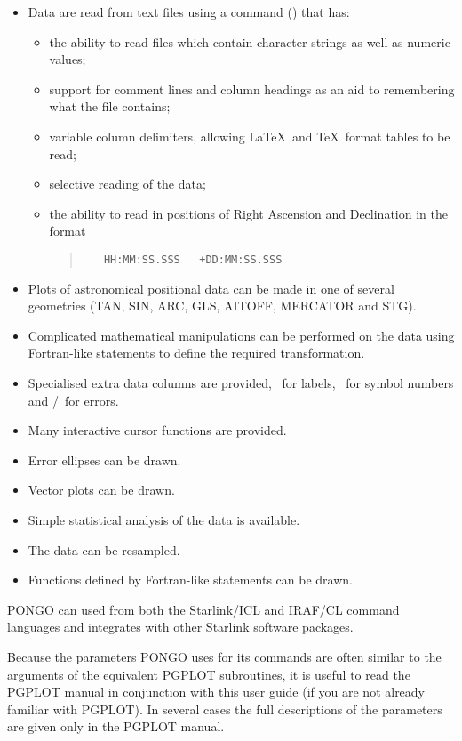 \begin{itemize}
\item Data are read from text files using a command ()
  that has:
  \begin{itemize}
  \item the ability to read files which contain character strings as well as
    numeric values;
  \item support for comment lines and column headings as an aid to remembering
    what the file contains;
  \item variable column delimiters, allowing \LaTeX\ and \TeX\
    format tables to be read;
  \item selective reading of the data;
  \item the ability to read in positions of Right Ascension and
    Declination in the format
    \begin{quote}
\begin{verbatim}
   HH:MM:SS.SSS   +DD:MM:SS.SSS
\end{verbatim}
    \end{quote}
  \end{itemize}
\item Plots of astronomical positional data can be made in one of several
  geometries (TAN, SIN, ARC, GLS, AITOFF, MERCATOR and STG).

\item Complicated mathematical manipulations can be performed on the data
  using  Fortran-like statements to define the required transformation.
\item Specialised extra data columns are provided, \ie \labcol\ for
  labels, \symcol\ for symbol numbers and \excol/\eycol\ for errors.
\item Many interactive cursor functions are provided.
\item Error ellipses can be drawn.
\item Vector plots can be drawn.
\item Simple statistical analysis of the data is available.
\item The data can be resampled.
\item Functions defined by Fortran-like statements can be drawn.
\end{itemize}

PONGO can used from both the Starlink/ICL and IRAF/CL command
languages and integrates with other Starlink software packages.

Because the parameters PONGO uses for its commands are often similar
to the arguments of the equivalent PGPLOT subroutines, it is useful to
read the PGPLOT manual in conjunction with this user guide (if you are
not already familiar with PGPLOT).
In several cases the full descriptions of the parameters are given
only in the PGPLOT manual.

